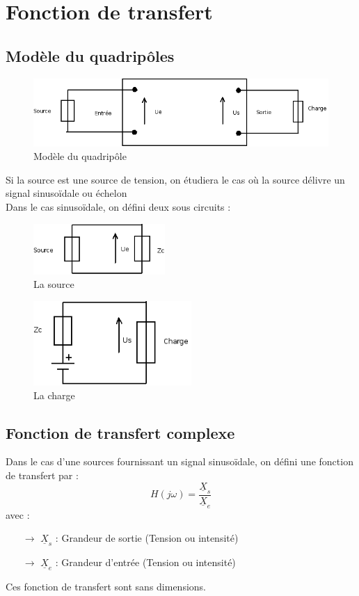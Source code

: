 \chapter{Fonction de transfert}
\section{Modèle du quadripôles}
\begin{figure}[ht]
  \includegraphics[width=12cm]{quadripole.png}
  \caption{Modèle du quadripôle}
\end{figure}
Si la source est une source de tension, on étudiera le cas où la source délivre un signal sinusoïdale ou échelon\\
Dans le cas sinusoïdale, on défini deux sous circuits : \\
\begin{figure}[ht]
  \centering
  \includegraphics[width=5cm]{Physique/source.png}
  \caption{La source}
\end{figure}
\begin{figure}[ht]
  \centering
  \includegraphics[width=6cm]{charge.png}
  \caption{La charge}
\end{figure}
\section{Fonction de transfert complexe}
\begin{de}
Dans le cas d'une sources fournissant un signal sinusoïdale, on défini une fonction de transfert par : 
$$H (j\omega) = \dfrac{\underline{X}_s}{\underline{X}_e}$$
avec :
\begin{itemize}
 \item[$\rightarrow$] $\underline{X}_s$ : Grandeur de sortie (Tension ou intensité)
 \item[$\rightarrow$] $\underline{X}_e$ : Grandeur d'entrée (Tension ou intensité)
\end{itemize}
Ces fonction de transfert sont sans dimensions.
\end{de}
